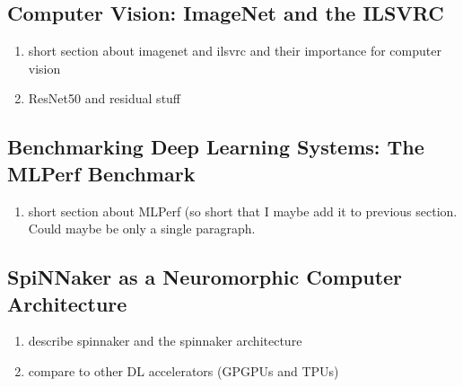 \documentclass[]{article}
\begin{document}





\subsection{Computer Vision: ImageNet and the ILSVRC} %

\begin{enumerate}
  \item short section about imagenet and ilsvrc and their importance
        for computer vision
  \item ResNet50 and residual stuff
\end{enumerate}



\subsection{Benchmarking Deep Learning Systems: The MLPerf Benchmark} %

\begin{enumerate}
  \item short section about MLPerf (so short that I maybe add it to
        previous section. Could maybe be only a single paragraph.
\end{enumerate}





\subsection{SpiNNaker as a Neuromorphic Computer Architecture} %

\begin{enumerate}
  \item describe spinnaker and the spinnaker architecture
  \item compare to other DL accelerators (GPGPUs and TPUs)
\end{enumerate}
\end{document}
